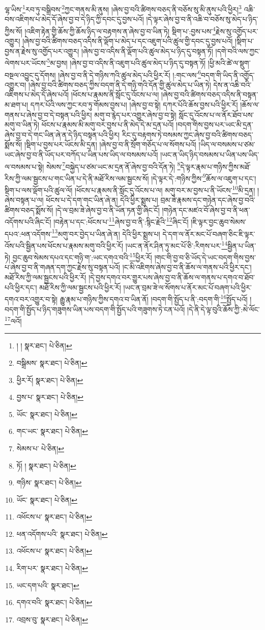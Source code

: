 ལྷ་ཡིས་\footnote{། །  སྣར་ཐང་།  པེ་ཅིན། }རབ་ཏུ་བསྒྲིབས་\footnote{བསྒྲིམས་  སྣར་ཐང་།  པེ་ཅིན། }ཀྱང་གནས་མི་ནུས། །ཞེས་བྱ་བའི་ཚིགས་བཅད་ནི་བཅོས་སུ་མི་ནུས་པའི་ཕྱིར།\footnote{ཕྱིར་རོ།  སྣར་ཐང་།  པེ་ཅིན། } འཆི་བས་འཇིགས་པ་མེད་དོ་ཞེས་བྱ་བ་དེ་ཉིད་ཀྱི་དབང་དུ་བྱས་པའོ། །དེ་ལྟར་ཞེས་བྱ་བ་ནི་འཆི་བ་བཅོས་སུ་མེད་པ་ཉིད་ཀྱིས་སོ། །འཇིག་རྟེན་གྱི་ཆོས་ཀྱི་ཆོས་ཉིད་ལ་བརྟགས་ན་ཞེས་བྱ་བ་ཡིན་ཏེ། སྡིག་པ་:བྱས་པས་\footnote{བྱས་པ་  སྣར་ཐང་།  པེ་ཅིན། }རྗེས་སུ་འགྱོད་པར་འགྱུར། །ཞེས་བྱ་བའི་ཚིགས་བཅད་འདིས་ནི་ལྡོག་པ་མེད་པ་དང་འཇུག་པའི་ཚུལ་གྱི་དབང་དུ་བྱས་པའོ། །སྡིག་པ་བྱས་ན་རྗེས་སུ་འགྱོད་པར་འགྱུར། །ཞེས་བྱ་བ་འདིས་ནི་ལྡོག་པའི་ཚུལ་མེད་པ་ཉིད་དུ་བསྟན་ཏོ། །དགེ་བའི་ལས་ཀྱང་ལེགས་པར་ཡོངས་\footnote{ཡོང་  སྣར་ཐང་།  པེ་ཅིན། }མ་བྱས། །ཞེས་བྱ་བ་འདིས་ནི་འཇུག་པའི་ཚུལ་མེད་པ་ཉིད་དུ་བསྟན་ཏོ། །ཕྱི་མའི་ཚེ་ལ་སྡུག་བསྔལ་འབྱུང་དུ་དོགས། །ཞེས་བྱ་བ་ནི་དེ་གཉིས་ཀའི་ཚུལ་མེད་པའི་ཕྱིར་རོ། །:གང་ལས་\footnote{གང་ཡང་  སྣར་ཐང་།  པེ་ཅིན། }བདག་གི་ཡིད་ནི་འགྱོད་འགྱུར་བ། །ཞེས་བྱ་བའི་ཚིགས་བཅད་ཀྱིས་བདག་ནི་དེ་གཉི་གའི་དོན་གྱི་ཚུལ་མེད་པ་ཡིན་ཏེ། དེས་ན་འཆི་བའི་འཇིགས་པ་མེད་དོ་ཞེས་པའོ། །ཕོངས་པ་རྣམས་ནི་སློང་དུ་འོངས་པ་ལ། །ཞེས་བྱ་བའི་ཚིགས་བཅད་འདིས་ནི་བསྟན་མ་ཐག་པ། དཀར་པོའི་ལས་ཀྱང་རབ་ཏུ་གོམས་བྱས་པ། །ཞེས་བྱ་བ་སྟེ། དཀར་པོའི་ཆོས་བྱས་པའི་ཕྱིར་རོ། །ཆོས་ལ་གནས་པ་ཞེས་བྱ་བ་དེ་བསྟན་པའི་ཕྱིར། མགུ་བ་རྙེད་པར་འགྱུར་ཞེས་བྱ་བ་སྟེ། སློང་དུ་འོངས་པ་ལ་ནོར་ཐོབ་པས་མགུ་བ་ཡིན་ཏེ། ཕོངས་པ་རྣམས་མི་མགུ་བར་བྱས་པ་ནི་མེད་དེ་མ་དྲན་པའོ། །བདག་གིས་བྱས་པར་ཡང་མི་དྲན་ཞེས་བྱ་བ་དེ་གང་ཡིན་ཞེ་ན་དེ་ཉིད་བསྟན་པའི་ཕྱིར། རིང་དུ་བརྟགས་ཏེ་བསམས་ཀྱང་ཞེས་བྱ་བའི་ཚིགས་བཅད་སྨོས་སོ། །སྡིག་པ་བྱས་པར་ཡོངས་མི་དྲན། །ཞེས་བྱ་བ་ནི་སྲོག་གཅོད་པ་ལ་སོགས་པའོ། །ཡིད་ལ་བསམས་པ་ཙམ་ཡང་ཞེས་བྱ་བ་ནི་ཡོད་པར་བཀོད་པ་ཡིན་པས་ཡིད་ལ་བསམས་པའོ། །ཡང་ན་ཡིད་ཉིད་བསམས་པ་ཡིན་པས་ཡིད་ལ་བསམས་པ་སྟེ། སེམས་\footnote{སེམས་པ་  པེ་ཅིན། }བསྐྱེད་པ་ཙམ་ཡང་མ་དྲན་ནོ་ཞེས་བྱ་བའི་དོན་ཏེ། \footnote{ཏོ། །   སྣར་ཐང་།  པེ་ཅིན། }དེ་ལྟར་རྣམ་པ་གཉིས་ཀྱིས་མཐོ་རིས་ཀྱི་ལམ་སྦྱངས་པ་གང་ཡིན་པ་དེ་ནི་མཐོ་རིས་ལམ་སྦྱངས་སོ། །དེ་ལྟར་དེ་:གཉིས་ཀྱིས་\footnote{གཉིས་  སྣར་ཐང་།  པེ་ཅིན། }ཆོས་ལ་འཇུག་པ་དང་། སྡིག་པ་ལས་ལྡོག་པའི་ཚུལ་ལོ། །ཕོངས་པ་རྣམས་ནི་སློང་དུ་འོངས་པ་ལ། མགུ་བར་མ་བྱས་པ་ནི་ཡོངས་\footnote{ཡོང་  སྣར་ཐང་།  པེ་ཅིན། }མི་དྲན། །ཞེས་བསྟན་པ་ལ། ཕོངས་པ་དེ་དག་གང་ཡིན་ཞེ་ན། དེའི་ཕྱིར་སྨྲས་པ། བྲམ་ཟེ་རྣམས་དང་གཉེན་དང་ཞེས་བྱ་བའི་ཚིགས་བཅད་སྨོས་སོ། །དེ་ལ་བྲམ་ཟེ་ཞེས་བྱ་བ་ནི་ཡོན་ཏན་གྱི་ཞིང་ངོ། །གཉེན་དང་མཛའ་བོ་ཞེས་བྱ་བ་ནི་ཕན་འདོགས་པའི་ཞིང་ངོ། །བརྟེན་པ་དང་:ཕོངས་པ་\footnote{འཕོངས་པ་  སྣར་ཐང་།  པེ་ཅིན། }ཞེས་བྱ་བ་ནི་:སྙིང་རྗེའི་\footnote{ཕན་འདོགས་པའི་  སྣར་ཐང་།  པེ་ཅིན། }ཞིང་ངོ། །ཇི་ལྟར་བྱང་ཆུབ་སེམས་དཔའ་:ཕན་འདོགས་\footnote{འཕོངས་པ་  སྣར་ཐང་།  པེ་ཅིན། }མགུ་བར་བྱེད་པ་ཡིན་ཞེ་ན། དེའི་ཕྱིར་སྨྲས་པ། དེ་དག་ལ་ནོར་མང་པོ་བཞག་ཅིང་ཇི་ལྟར་འོས་པའི་སྦྱིན་པས་ཕོངས་པ་རྣམས་མགུ་བའི་ཕྱིར་རོ། །ཡང་ན་ནོར་ཤིན་ཏུ་མང་པོ་ཅི་:རིགས་པར་\footnote{རིག་པར་  སྣར་ཐང་།  པེ་ཅིན། }སྦྱིན་པ་ཡིན་ཏེ། བྱང་ཆུབ་སེམས་དཔའ་དང་གཉི་ག་:ཡང་དགའ་བའི་\footnote{ཡང་དག་པའི་  སྣར་ཐང་། }ཕྱིར་རོ། །གང་གི་བྱ་བ་ཅི་ཡོད་དེ་ཡང་བདག་གིས་བྱས་པ་ཞེས་བྱ་བ་ནི་གཞན་དག་ཀྱང་རྗེས་སུ་བསྟན་པའོ། །ང་མི་འཇིགས་ཞེས་བྱ་བ་ནི་ཆོས་ལ་གནས་པའི་ཕྱིར་དང་། མཐོ་རིས་ཀྱི་ལམ་སྦྱངས་པའི་ཕྱིར་རོ། །དེ་བྱས་དགའ་བར་གྱུར་པས་ཞེས་བྱ་བ་ནི་ཆོས་ལ་གནས་པ་དགའ་བ་ཐོབ་པའི་ཕྱིར་དང་། མཐོ་རིས་ཀྱི་ལམ་སྦྱངས་པའི་ཕྱིར་རོ། །ཡང་ན་བྲམ་ཟེ་ལ་སོགས་པ་ནོར་མང་པོ་བཞག་པའི་ཕྱིར་དགའ་བར་འགྱུར་བ་སྟེ། རྒྱུ་རྣམ་པ་གཉིས་ཀྱིས་དགའ་བ་ཡིན་ནོ། །བདག་གི་སྤྱོད་པ་ནི་:བདག་གི་\footnote{དགའ་བའི་  སྣར་ཐང་།  པེ་ཅིན། }སྤྱོད་པའོ། །བདག་གི་སྤྱོད་པ་ཉིད་གཟུགས་ཡིན་པས་བདག་གི་སྤྱོད་པའི་གཟུགས་ཏེ་ངན་པའོ། །དེ་ནི་དེ་ལྟ་བུའི་ཆོས་ཀྱི་:མེ་ལོང་\footnote{འབྲས་བུ་  སྣར་ཐང་།  པེ་ཅིན། }ལའོ། 